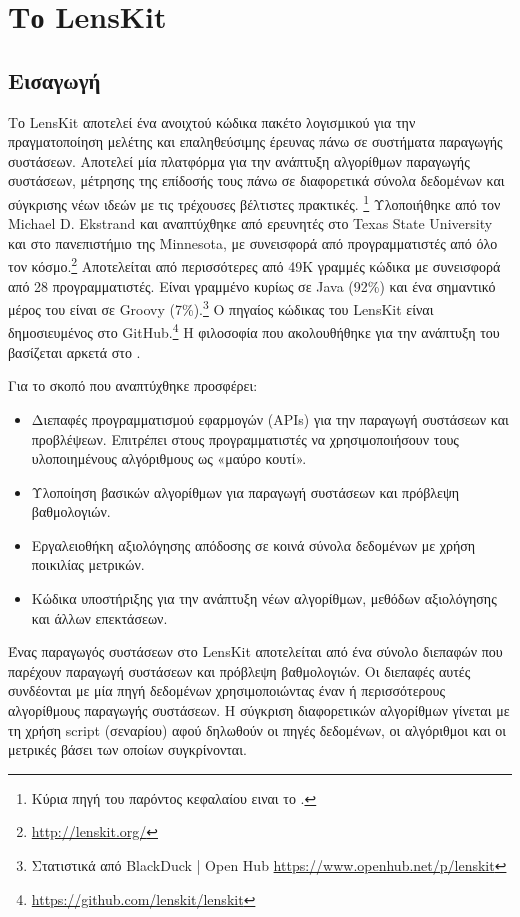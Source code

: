 \chapter{Το {\en LensKit}}
\label{Chapter4}

\section{Εισαγωγή}

Το {\en LensKit} \cite{Ekstrand:2011:RRR:2043932.2043958} αποτελεί ένα ανοιχτού κώδικα πακέτο λογισμικού για την πραγματοποίηση μελέτης και επαληθεύσιμης έρευνας πάνω σε συστήματα παραγωγής συστάσεων. Αποτελεί μία πλατφόρμα για την ανάπτυξη αλγορίθμων παραγωγής συστάσεων, μέτρησης της επίδοσής τους πάνω σε διαφορετικά σύνολα δεδομένων και σύγκρισης νέων ιδεών με τις τρέχουσες βέλτιστες πρακτικές. \cite{ekstrand_towards_2014}\footnote{Κύρια πηγή του παρόντος κεφαλαίου ειναι το \cite{ekstrand_towards_2014}.} Υλοποιήθηκε από τον {\en Michael D. Ekstrand} και αναπτύχθηκε από ερευνητές στο {\en Texas State University} και στο πανεπιστήμιο της {\en Minnesota}, με συνεισφορά από προγραμματιστές από όλο τον κόσμο.\footnote{\en \url{http://lenskit.org/}} Αποτελείται από περισσότερες από 49Κ γραμμές κώδικα με συνεισφορά από 28 προγραμματιστές. Είναι γραμμένο κυρίως σε {\en Java} (92\%) και ένα σημαντικό μέρος του είναι σε {\en Groovy} (7\%).\footnote{Στατιστικά από \en BlackDuck | Open Hub \url{https://www.openhub.net/p/lenskit}} Ο πηγαίος κώδικας του {\en LensKit} είναι δημοσιευμένος στο {\en GitHub}.\footnote{\en \url{https://github.com/lenskit/lenskit}} Η φιλοσοφία που ακολουθήθηκε για την ανάπτυξη του βασίζεται αρκετά στο \cite{Bloch:2008:EJ:1377533}.\par 
Για το σκοπό που αναπτύχθηκε προσφέρει:
\begin{itemize}
 \item Διεπαφές προγραμματισμού εφαρμογών ({\en APIs}) για την παραγωγή συστάσεων και προβλέψεων. Επιτρέπει στους προγραμματιστές να χρησιμοποιήσουν τους υλοποιημένους αλγόριθμους ως «μαύρο κουτί».
 \item Υλοποίηση βασικών αλγορίθμων για παραγωγή συστάσεων και πρόβλεψη βαθμολογιών. 
 \item Εργαλειοθήκη αξιολόγησης απόδοσης σε κοινά σύνολα δεδομένων με χρήση ποικιλίας μετρικών.
 \item Κώδικα υποστήριξης για την ανάπτυξη νέων αλγορίθμων, μεθόδων αξιολόγησης και άλλων επεκτάσεων.
\end{itemize}
\par Ένας παραγωγός συστάσεων στο {\en LensKit} αποτελείται από ένα σύνολο διεπαφών που παρέχουν παραγωγή συστάσεων και πρόβλεψη βαθμολογιών. Οι διεπαφές αυτές συνδέονται με μία πηγή δεδομένων χρησιμοποιώντας έναν ή περισσότερους αλγορίθμους παραγωγής συστάσεων. Η σύγκριση διαφορετικών αλγορίθμων γίνεται με τη χρήση {\en script} (σεναρίου) αφού δηλωθούν οι πηγές δεδομένων, οι αλγόριθμοι και οι μετρικές βάσει των οποίων συγκρίνονται.
